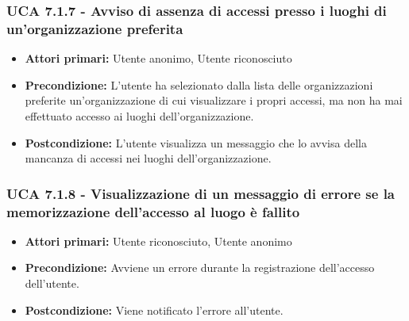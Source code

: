 \subsubsection{UCA 7.1.7 - Avviso di assenza di accessi presso i luoghi di un'organizzazione preferita}
\begin{itemize}
    \item \textbf{Attori primari:} Utente anonimo, Utente riconosciuto
    \item \textbf{Precondizione:} L'utente ha selezionato dalla lista delle organizzazioni preferite un'organizzazione di cui visualizzare i propri accessi, ma non ha mai effettuato accesso ai luoghi dell'organizzazione.
    \item \textbf{Postcondizione:} L'utente visualizza un messaggio che lo avvisa della mancanza di accessi nei luoghi dell'organizzazione.
\end{itemize}

\subsubsection{UCA 7.1.8 - Visualizzazione di un messaggio di errore se la memorizzazione dell'accesso al luogo è fallito}
\begin{itemize}
	\item \textbf{Attori primari:} Utente riconosciuto, Utente anonimo
	\item \textbf{Precondizione:} Avviene un errore durante la registrazione dell'accesso dell'utente.
	\item \textbf{Postcondizione:} Viene notificato l'errore all'utente.
\end{itemize}
